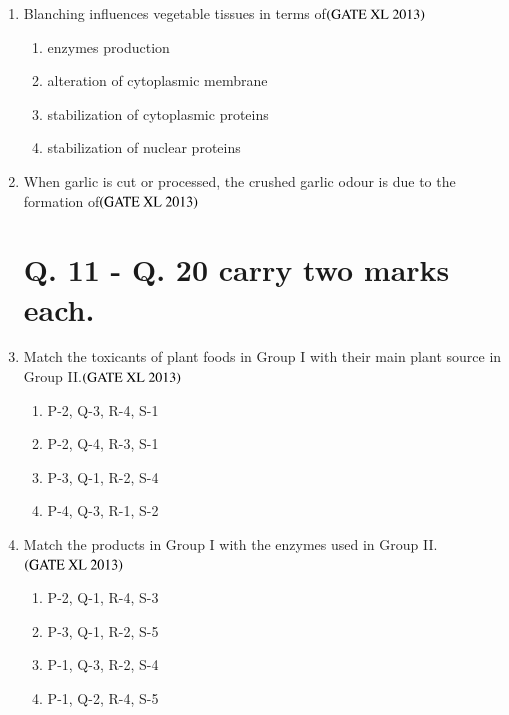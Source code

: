 \documentclass[journal]{IEEEtran}
\begin{document}
\begin{enumerate}
\item Blanching influences vegetable tissues in terms of\hfill $\left(\text{GATE XL 2013}\right)$
\begin{enumerate}
    \item enzymes production
    \item alteration of cytoplasmic membrane
    \item stabilization of cytoplasmic proteins
    \item stabilization of nuclear proteins
\end{enumerate}

\item When garlic is cut or processed, the crushed garlic odour is due to the formation of\hfill $\left(\text{GATE XL 2013}\right)$
\begin{enumerate}
\end{enumerate}

\section*{Q. 11 - Q. 20 carry two marks each.}

\item Match the toxicants of plant foods in Group I with their main plant source in Group II.\hfill $\left(\text{GATE XL 2013}\right)$
\begin{enumerate}
    \item P-2, Q-3, R-4, S-1
    \item P-2, Q-4, R-3, S-1
    \item P-3, Q-1, R-2, S-4
    \item P-4, Q-3, R-1, S-2
\end{enumerate}

\item Match the products in Group I with the enzymes used in Group II.\hfill $\left(\text{GATE XL 2013}\right)$
\begin{enumerate}
    \item P-2, Q-1, R-4, S-3
    \item P-3, Q-1, R-2, S-5
    \item P-1, Q-3, R-2, S-4
    \item P-1, Q-2, R-4, S-5
\end{enumerate}


\end{enumerate}
\end{document}
